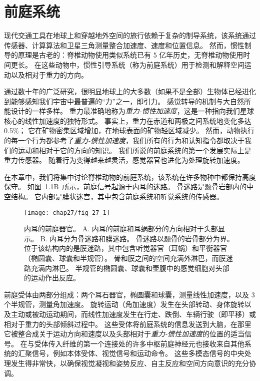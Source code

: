 \chapter{前庭系统} \label{chap:chap27}

现代交通工具在地球上和穿越地外空间的旅行依赖于复杂的制导系统，该系统通过传感器、计算算法和卫星三角测量整合加速度、速度和位置信息。
然而，惯性制导的原理是古老的：脊椎动物使用类似系统已有 5 亿年历史，无脊椎动物使用时间更长。
在这些动物中，惯性引导系统（称为前庭系统）用于检测和解释空间运动以及相对于重力的方向。


通过数十年的广泛研究，很明显地球上的大多数（如果不是全部）生物体已经进化到能够感知我们宇宙中最普遍的“力”之一，即引力。
感觉转导的机制与大自然所能设计的一样多样。
重力最准确地称为\textit{重力-惯性加速度}，这是一种指向我们星球核心的线性加速度的独特形式。
事实上，重力在赤道和两极之间系统地变化多达 0.5\%；
它在矿物密集区域增加，在地球表面的矿物轻区域减少。
然而，动物执行的每一个行为都参考了\textit{重力-惯性加速度}，我们所有的行为和认知指令都取决于我们的运动和相对于它的方向的知识。
我们所说的前庭系统的第一个发展实际上是重力传感器。
随着行为变得越来越灵活，感觉器官也进化为处理旋转加速度。


在本章中，我们将集中讨论脊椎动物的前庭系统，该系统在许多物种中都保持高度保守。
如图~\ref{fig:27_1}B~所示，前庭信号起源于内耳的迷路。
骨迷路是颞骨岩部内的中空结构。
它内部是膜状迷宫，其中包含前庭系统和听觉系统的传感器。


\begin{figure}[htbp]
	\centering
	\texttt{[image: chap27/fig\_27\_1]}
	\caption{内耳的前庭器官。
		A. 内耳的前庭和耳蜗部分的方向相对于头部显示。
		B. 内耳分为骨迷路和膜迷路。
		骨迷路以颞骨的岩骨部分为界。
		位于该结构内的是膜迷路，其中包含听觉器官（耳蜗）和平衡器官（椭圆囊、球囊和半规管）。
		骨和膜之间的空间充满外淋巴，而膜迷路充满内淋巴。
		半规管的椭圆囊、球囊和壶腹中的感觉细胞对头部的运动作出反应\cite{iurato2013submicroscopic}。}
	\label{fig:27_1}
\end{figure}


前庭受体由两部分组成：两个耳石器官，椭圆囊和球囊，测量线性加速度，以及 3 个半规管，测量角加速度。
旋转运动（角加速度）发生在头部转动、身体旋转以及主动或被动运动期间，而线性加速度发生在行走、跌倒、车辆行驶（即平移）或相对于重力的头部倾斜过程中。
这些受体将前庭系统的信息发送到大脑，在那里它被整合成关于运动方向和速度以及头部相对于\textit{重力-惯性加速度}的位置的适当信号。
在与受体传入纤维的第一个连接处的许多中枢前庭神经元也接收来自其他系统的汇聚信号，例如本体受体、视觉信号和运动命令。
这些多模态信号的中央处理发生得非常快，以确保视觉凝视和姿势反应、自主反应和空间方向意识的充分协调。



